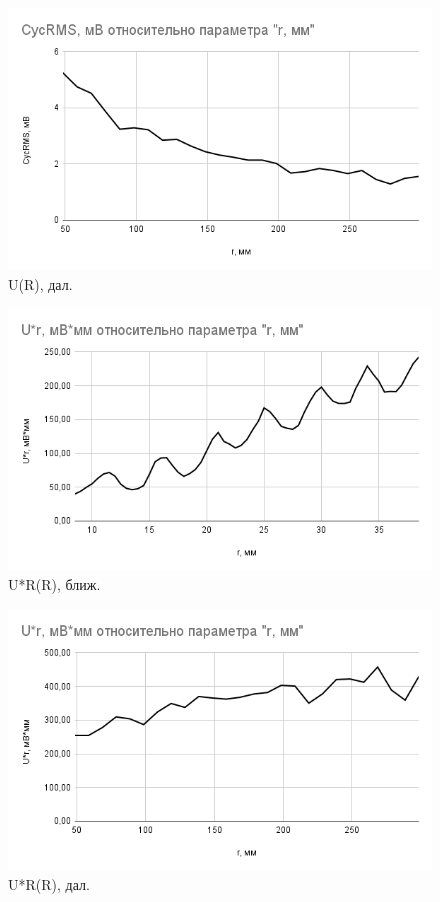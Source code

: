 \documentclass[a4paper,12pt]{article}
\begin{document}
\begin{figure}[ht!]
    \centering
    \includegraphics[scale=0.7]{ur_d.png}
    \caption{U(R), дал.}
\end{figure}

\clearpage

\begin{figure}[ht!]
    \centering
    \includegraphics[scale=0.7]{urr_b.png}
    \caption{U*R(R), ближ.}
\end{figure}

\begin{figure}[ht!]
    \centering
    \includegraphics[scale=0.7]{urr_d.png}
    \caption{U*R(R), дал.}
\end{figure}
\clearpage
\end{document}
